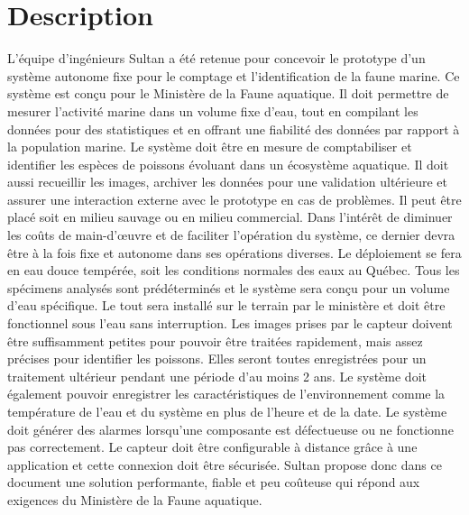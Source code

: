 
%
%

\chapter{Description}
\label{s:description}

L’équipe d’ingénieurs Sultan a été retenue pour concevoir le prototype d’un système autonome fixe pour le comptage et l’identification de la faune marine.
Ce système est conçu pour le Ministère de la Faune aquatique.
\wl
Il doit permettre de mesurer l’activité marine dans un volume fixe d’eau, tout en compilant les données pour des statistiques et en offrant une fiabilité des données par rapport à la population marine.
Le système doit être en mesure de comptabiliser et identifier les espèces de poissons évoluant dans un écosystème aquatique.
Il doit aussi recueillir les images, archiver les données pour une validation ultérieure et assurer une interaction externe avec le prototype en cas de problèmes. Il peut être placé soit en milieu sauvage ou en milieu commercial.
Dans l’intérêt de diminuer les coûts de main-d’œuvre et de faciliter l’opération du système, ce dernier devra être à la fois fixe et autonome dans ses opérations diverses.
\wl
Le déploiement se fera en eau douce tempérée, soit les conditions normales des eaux au Québec.
Tous les spécimens analysés sont prédéterminés et le système sera conçu pour un volume d’eau spécifique.
Le tout sera installé sur le terrain par le ministère et doit être fonctionnel sous l’eau sans interruption.
Les images prises par le capteur doivent être suffisamment petites pour pouvoir être traitées rapidement, mais assez précises pour identifier les poissons. 
Elles seront toutes enregistrées pour un traitement ultérieur pendant une période d’au moins 2 ans.
Le système doit également pouvoir enregistrer les caractéristiques de l’environnement comme la température de l’eau et du système en plus de l’heure et de la date.
Le système doit générer des alarmes lorsqu’une composante est défectueuse ou ne fonctionne pas correctement.
Le capteur doit être configurable à distance grâce à une application et cette connexion doit être sécurisée.
\wl
Sultan propose donc dans ce document une solution performante, fiable et peu coûteuse qui répond aux exigences du Ministère de la Faune aquatique.


